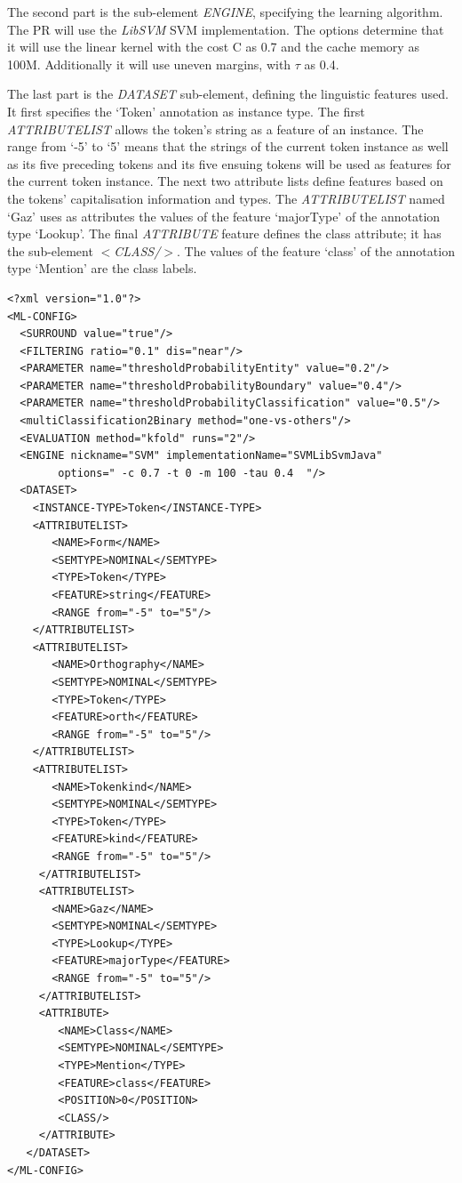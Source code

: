 The second part is the sub-element {\em ENGINE}, specifying the learning
algorithm. The PR will use the {\em LibSVM} SVM implementation. The options
determine that it will use the linear kernel with the cost C as 0.7 and the cache
memory as 100M. Additionally it will use uneven margins, with $\tau$ as 0.4.

The last part is the {\em DATASET} sub-element, defining the linguistic features
used.  It first specifies the `Token' annotation as instance type. The first
{\em ATTRIBUTELIST} allows the token's string as a feature of an instance. 
The range from `-5' to `5' means that the strings of the current token instance
as well as its five preceding tokens and its five ensuing tokens will be used
as features for the current token instance. The next two attribute lists define
features based on the tokens' capitalisation information and types. The 
{\em ATTRIBUTELIST} named `Gaz' uses as attributes the values of the feature
`majorType' of the annotation type `Lookup'. The final {\em ATTRIBUTE}
feature defines the class attribute; it has the sub-element {\em
$<$CLASS/$>$}. The values of the feature `class' of the annotation type
`Mention' are the class labels.

\vspace{0.2cm}
\begin{small}\begin{verbatim}
<?xml version="1.0"?>
<ML-CONFIG>
  <SURROUND value="true"/>
  <FILTERING ratio="0.1" dis="near"/>
  <PARAMETER name="thresholdProbabilityEntity" value="0.2"/>
  <PARAMETER name="thresholdProbabilityBoundary" value="0.4"/>
  <PARAMETER name="thresholdProbabilityClassification" value="0.5"/>
  <multiClassification2Binary method="one-vs-others"/>
  <EVALUATION method="kfold" runs="2"/>
  <ENGINE nickname="SVM" implementationName="SVMLibSvmJava" 
        options=" -c 0.7 -t 0 -m 100 -tau 0.4  "/>
  <DATASET>
    <INSTANCE-TYPE>Token</INSTANCE-TYPE>
    <ATTRIBUTELIST>
       <NAME>Form</NAME>
       <SEMTYPE>NOMINAL</SEMTYPE>
       <TYPE>Token</TYPE>
       <FEATURE>string</FEATURE>
       <RANGE from="-5" to="5"/>
    </ATTRIBUTELIST>
    <ATTRIBUTELIST>
       <NAME>Orthography</NAME>
       <SEMTYPE>NOMINAL</SEMTYPE>
       <TYPE>Token</TYPE>
       <FEATURE>orth</FEATURE>
       <RANGE from="-5" to="5"/>
    </ATTRIBUTELIST>	
    <ATTRIBUTELIST>
       <NAME>Tokenkind</NAME>
       <SEMTYPE>NOMINAL</SEMTYPE>
       <TYPE>Token</TYPE>
       <FEATURE>kind</FEATURE>
       <RANGE from="-5" to="5"/>
     </ATTRIBUTELIST>
     <ATTRIBUTELIST>
       <NAME>Gaz</NAME>
       <SEMTYPE>NOMINAL</SEMTYPE>
       <TYPE>Lookup</TYPE>
       <FEATURE>majorType</FEATURE>
       <RANGE from="-5" to="5"/>
     </ATTRIBUTELIST>
     <ATTRIBUTE>
        <NAME>Class</NAME>
        <SEMTYPE>NOMINAL</SEMTYPE>
        <TYPE>Mention</TYPE>
        <FEATURE>class</FEATURE>
        <POSITION>0</POSITION>
        <CLASS/>
     </ATTRIBUTE>
   </DATASET>
</ML-CONFIG>
\end{verbatim}\end{small}
\vspace{0.5cm}


